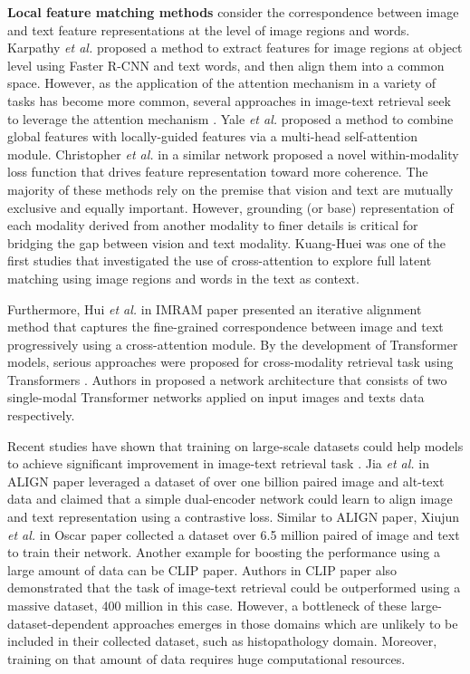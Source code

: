 \documentclass{midl}
\begin{document}
\textbf{Local feature matching methods} consider the correspondence between image and text feature representations at the level of image regions and words. Karpathy \textit{et al.} \cite{karpathy2015deep} proposed a method to extract features for image regions at object level using Faster R-CNN \cite{ren2015faster} and text words, and then align them into a common space. However, as the application of the attention mechanism in a variety of tasks has become more common, several approaches in image-text retrieval seek to leverage the attention mechanism  \cite{chen2020imram,lee2018stacked,song2019polysemous,thomas2020preserving, lee2018stacked}. Yale \textit{et al.} \cite{song2019polysemous} proposed a method to combine global features with locally-guided features via a multi-head self-attention module. Christopher \textit{et al.} \cite{thomas2020preserving} in a similar network proposed a novel within-modality loss function that drives feature representation toward more coherence. The majority of these methods rely on the premise that vision and text are mutually exclusive and equally important. However, grounding (or base) representation of each modality derived from another modality to finer details is critical for bridging the gap between vision and text modality. Kuang-Huei  \cite{lee2018stacked} was one of the first studies that investigated the use of cross-attention to explore full latent matching using image regions and words in the text as context.

Furthermore, Hui \textit{et al.} in IMRAM paper \cite{chen2020imram} presented an iterative alignment method that captures the fine-grained correspondence between image and text progressively using a cross-attention module. By the development of Transformer models, serious approaches were proposed for cross-modality retrieval task using Transformers \cite{lu2019vilbert,tan2019lxmert}. Authors in \cite{lu2019vilbert} proposed a network architecture that consists of two single-modal Transformer networks applied on input images and texts data respectively.

Recent studies have shown that training on large-scale datasets could help models to achieve significant improvement in image-text retrieval task \cite{li2020oscar,radford2021learning,jia2021scaling}. Jia \textit{et al.} in ALIGN paper \cite{jia2021scaling} leveraged a dataset of over one billion paired image and alt-text data and claimed that a simple dual-encoder network could learn to align image and text representation using a contrastive loss. Similar to ALIGN paper, Xiujun \textit{et al.} in Oscar paper \cite{li2020oscar} collected a dataset over 6.5 million paired of image and text to train their network. Another example for boosting the performance using a large amount of data can be CLIP \cite{radford2021learning} paper. Authors in CLIP paper also demonstrated that the task of image-text retrieval could be outperformed using a massive dataset, 400 million in this case. However, a bottleneck of these large-dataset-dependent approaches emerges in those domains which are unlikely to be included in their collected dataset, such as histopathology domain. Moreover, training on that amount of data requires huge computational resources.
\end{document}
